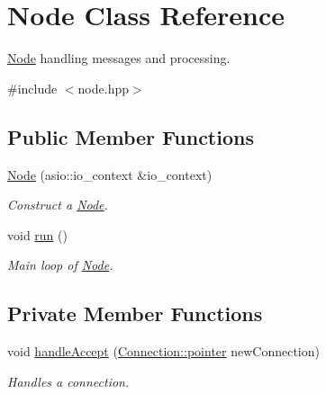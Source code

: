 \hypertarget{classNode}{}\section{Node Class Reference}
\label{classNode}


\mbox{\hyperlink{classNode}{Node}} handling messages and processing.  




{\ttfamily \#include $<$node.\+hpp$>$}

\subsection*{Public Member Functions}
\begin{DoxyCompactItemize}
\item 
\mbox{\hyperlink{classNode_a69479b3f2c9ca25cc6f178c30c8b7da8}{Node}} (asio\+::io\+\_\+context \&io\+\_\+context)
\begin{DoxyCompactList}\small\item\em Construct a \mbox{\hyperlink{classNode}{Node}}. \end{DoxyCompactList}\item 
void \mbox{\hyperlink{classNode_a89bb61a94d73680b692280d83e83d2f4}{run}} ()
\begin{DoxyCompactList}\small\item\em Main loop of \mbox{\hyperlink{classNode}{Node}}. \end{DoxyCompactList}\end{DoxyCompactItemize}
\subsection*{Private Member Functions}
\begin{DoxyCompactItemize}
\item 
void \mbox{\hyperlink{classNode_a7955793e35a52f192e7e5f82dd541092}{handle\+Accept}} (\mbox{\hyperlink{classConnection_a1bb6cd8924ff091e9b053e3368735c9c}{Connection\+::pointer}} new\+Connection)
\begin{DoxyCompactList}\small\item\em Handles a connection. \end{DoxyCompactList}\end{DoxyCompactItemize}

